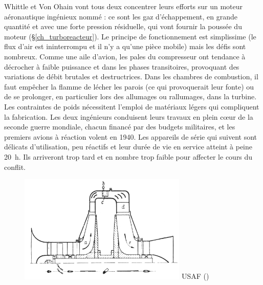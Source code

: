 Whittle et Von Ohain vont tous deux concentrer leurs efforts sur un moteur aéronautique ingénieux nommé  : ce sont les gaz d’échappement, en grande quantité et avec une forte pression résiduelle, qui vont fournir la poussée du moteur (\S\ref{ch_turboreacteur}). Le principe de fonctionnement est simplissime (le flux d’air est ininterrompu et il n’y a qu’une pièce mobile) mais les défis sont nombreux. Comme une aile d’avion, les pales du compresseur ont tendance à décrocher à faible puissance et dans les phases transitoires, provoquant des variations de débit brutales et destructrices. Dans les chambres de combustion, il faut empêcher la flamme de lécher les parois (ce qui provoquerait leur fonte) ou de se prolonger, en particulier lors des allumages ou rallumages, dans la turbine. Les contraintes de poids nécessitent l’emploi de matériaux légers qui compliquent la fabrication. Les deux ingénieurs conduisent leurs travaux en plein cœur de la seconde guerre mondiale, chacun financé par des budgets militaires, et les premiers avions à réaction volent en 1940. Les appareils de série qui suivent sont délicats d’utilisation, peu réactifs et leur durée de vie en service atteint à peine \SI{20}{\hour}. Ils arriveront trop tard et en nombre trop faible pour affecter le cours du conflit.

	\begin{figure}
		\begin{center}
			\includegraphics[width=8cm]{images/he_s1.png}
				{ USAF (\pd)}
			\label{fig_turbinia}
		\end{center}
	\end{figure}

